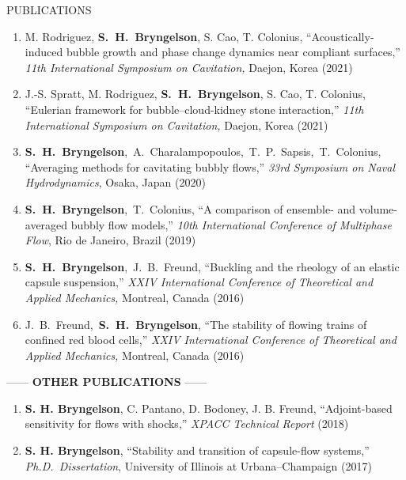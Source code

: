 \documentclass{resume} %
\makeatletter
\newlength{\bibhang}
\newlength{\bibsep}
\newenvironment{bibsection}%
        {\begin{enumerate}{}{%
       \setlength{\leftmargin}{\bibhang}%
       \setlength{\itemindent}{-\leftmargin}%
       \setlength{\itemsep}{\bibsep}%
       \setlength{\parsep}{\z@}%
        \setlength{\topsep}{0pt}}}
        {\end{enumerate}\vspace{-.1\baselineskip}}
\newcommand\SHB{\mbox{\textbf{S. H. Bryngelson}}}
\newcommand\Authors{\mbox{\textbf{S. H. Bryngelson}, J. B. Freund}}
\newcommand\AltAuthors{\mbox{J. B. Freund, \textbf{S. H. Bryngelson}}}
\newcommand\SpencerTim{\mbox{\textbf{S. H. Bryngelson}, T. Colonius}}
\newcommand\SpencerThemis{\mbox{\textbf{S. H. Bryngelson}, A. Charalampopoulos, T. P. Sapsis, T. Colonius}}
\newcommand{\ICTAM}{International Conference of Theoretical and Applied Mechanics}
\makeatother
\begin{document}
\begin{rSection}{{\Large P}UBLICATIONS}
\begin{bibsection}
    \item M. Rodriguez, \SHB, S. Cao, T. Colonius,
    ``Acoustically-induced bubble growth and phase change dynamics near compliant surfaces,''
    \textit{11th International Symposium on Cavitation,} Daejon, Korea (2021)

    \item J.-S. Spratt, M. Rodriguez, \SHB, S. Cao, T. Colonius,
    ``Eulerian framework for bubble--cloud-kidney stone interaction,''
    \textit{11th International Symposium on Cavitation,} Daejon, Korea (2021)

	\item \SpencerThemis, 
    ``Averaging methods for cavitating bubbly flows,''
	\textit{33rd Symposium on Naval Hydrodynamics}, Osaka, Japan (2020)

	\item \SpencerTim, 
    ``A comparison of ensemble- and volume-averaged bubbly flow models,'' 
	\textit{10th International Conference of Multiphase Flow}, Rio de Janeiro, Brazil (2019)

	\item \Authors, 
    ``Buckling and the rheology of an elastic capsule suspension,'' 
	\textit{XXIV \ICTAM,} Montreal, Canada (2016)	

    \item \AltAuthors, 
     ``The stability of flowing trains of confined red blood cells,'' 
	\textit{XXIV \ICTAM,} Montreal, Canada (2016)				
\end{bibsection}

\medskip 

\begin{center}
    ------ \textbf{OTHER PUBLICATIONS} ------
\end{center}

\begin{bibsection}
    \setlength{\itemsep}{\bibsep}%
    \item \textbf{S. H. Bryngelson}, C. Pantano, D. Bodoney, J. B. Freund, 
        ``Adjoint-based sensitivity for flows with shocks,''
	   \textit{XPACC Technical Report}  (2018)

   \item \textbf{S. H. Bryngelson}, 
       ``Stability and transition of capsule-flow systems,''
       \textit{Ph.D.\ Dissertation}, University of Illinois at Urbana--Champaign (2017)
\end{bibsection}

\end{rSection}
\end{document}
